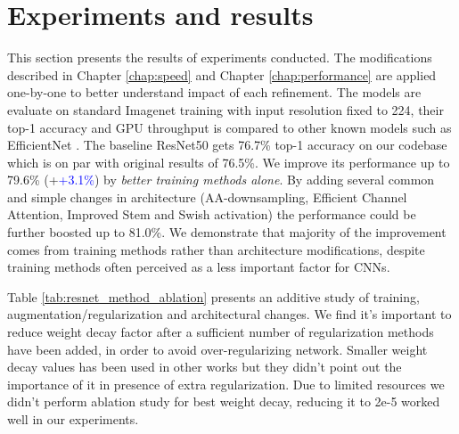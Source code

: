 
% 
\chapter{Experiments and results}



This section presents the results of experiments conducted. The modifications described in Chapter \ref{chap:speed} and Chapter \ref{chap:performance} are applied one-by-one to better understand impact of each refinement. The models are evaluate on standard Imagenet training with input resolution fixed to 224, their top-1 accuracy and GPU throughput is compared to other known models such as EfficientNet \cite{tan2019_efficientnet}. The baseline ResNet50 gets 76.7\% top-1 accuracy on our codebase which is on par with original results of 76.5\%. We improve its performance up to 79.6\% (+\textcolor{blue}{+3.1\%}) by \textit{better training methods alone}. By adding several common and simple changes in architecture (AA-downsampling, Efficient Channel Attention, Improved Stem and Swish activation) the performance could be further boosted up to 81.0\%. We demonstrate that majority of the improvement comes from training methods rather than architecture modifications, despite training methods often perceived as a less important factor for CNNs.  

Table \ref{tab:resnet_method_ablation} presents an additive study of training, augmentation/regularization and architectural changes. We find it's important to reduce weight decay factor after a sufficient number of regularization methods have been added, in order to avoid over-regularizing network. Smaller weight decay values has been used in other works \cite{tan2019_efficientnet} \cite{bello2021_revisiting_resnet} but they didn't point out the importance of it in presence of extra regularization. Due to limited resources we didn't perform ablation study for best weight decay, reducing it to 2e-5 worked well in our experiments.

